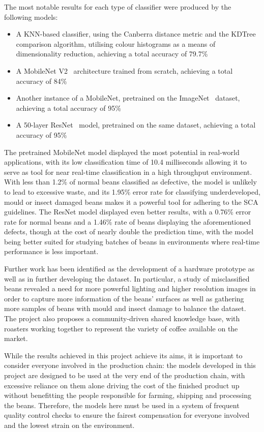 The most notable results for each type of classifier were produced by the following models:
\begin{itemize}
    \item A KNN-based classifier, using the Canberra distance metric and the KDTree~\cite{kdtreeKNN} comparison algorithm,
    utilising colour histograms as a means of dimensionality reduction, achieving a total accuracy of 79.7\%
    \item A MobileNet V2~\cite{mobileNet} architecture trained from scratch, achieving a total accuracy of 84\%
    \item Another instance of a MobileNet, pretrained on the ImageNet~\cite{imageNet} dataset, achieving a total accuracy of 95\%
    \item A 50-layer ResNet~\cite{resNet} model, pretrained on the same dataset, achieving a total accuracy of 95\%
\end{itemize}

The pretrained MobileNet model displayed the most potential in real-world applications, with its low classification time
of 10.4 milliseconds allowing it to serve as tool for near real-time classification in a high throughput environment.
With less than 1.2\% of normal beans classified as defective, the model is unlikely to lead to excessive waste, and its
1.95\% error rate for classifying underdeveloped, mould or insect damaged beans makes it a powerful tool for adhering to
the SCA guidelines.
The ResNet model displayed even better results, with a 0.76\% error rate for normal beans and a 1.46\% rate of beans displaying
the aforementioned defects, though at the cost of nearly double the prediction time, with the model being better suited
for studying batches of beans in environments where real-time performance is less important.

Further work has been identified as the development of a hardware prototype as well as in further developing the dataset.
In particular, a study of misclassified beans revealed a need for more powerful lighting and higher resolution images in order to
capture more information of the beans' surfaces as well as gathering more samples of beans with mould and insect damage to
balance the dataset.
The project also proposes a community-driven shared knowledge base, with roasters working together to represent the variety of coffee
available on the market.

While the results achieved in this project achieve its aims, it is important to consider everyone involved in the production chain:
the models developed in this project are designed to be used at the very end of the production chain, with excessive reliance on
them alone driving the cost of the finished product up without benefitting the people responsible for farming, shipping and processing the beans.
Therefore, the models here must be used in a system of frequent quality control checks to ensure the fairest compensation for
everyone involved and the lowest strain on the environment.
